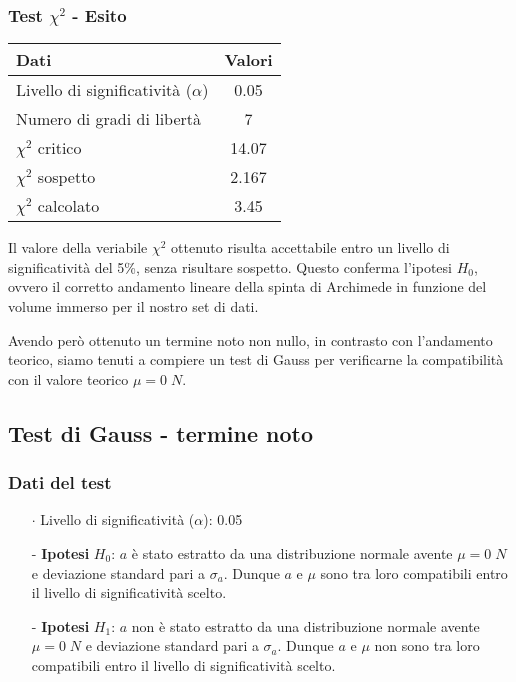 \documentclass{article}
\begin{document}
\subsubsection{Test $\chi^2$ - Esito}
\begin{wraptable}{r}{6.5cm}
	\centering
	\begin{tabular}{lc}
		\toprule
		\textbf{Dati} & \textbf{Valori} \\
		\midrule
		Livello di significatività ($\alpha $) & 0.05 \\
		Numero di gradi di libertà & 7\\
		$\chi^2$ critico & 14.07\\
        $\chi^2$ sospetto & 2.167\\
		$\chi^2$ calcolato & 3.45\\
		\bottomrule
	\end{tabular}
\end{wraptable}
Il valore della veriabile $\chi^2$  ottenuto risulta accettabile entro un livello di significatività del 5\%, senza risultare sospetto. Questo conferma l'ipotesi $H_0$, ovvero il corretto andamento lineare della spinta di Archimede in funzione del volume immerso per il nostro set di dati.\medskip

Avendo però ottenuto un termine noto non nullo, in contrasto con l'andamento teorico, siamo tenuti a compiere un test di Gauss per verificarne la compatibilità con il valore teorico $\mu=0\;N$.
\newpage\subsection{Test di Gauss - termine noto}

\subsubsection{Dati del test}
\begin{itemize}
    \item [$\cdot$] Livello di significatività ($\alpha$): 0.05
    \item [-] \textbf{Ipotesi} $H_0$: $a$ è stato estratto da una distribuzione normale avente $\mu = 0\;N$ e deviazione standard pari a $\sigma_{a}$.
    Dunque $a$ e $\mu$ sono tra loro compatibili entro il livello di significatività scelto. 
    \item [-] \textbf{Ipotesi} $H_1$: $a$ non è stato estratto da una distribuzione normale avente $\mu = 0\;N$ e deviazione standard pari a $\sigma_{a}$. Dunque $a$ e $\mu$ non sono tra loro compatibili entro il livello di significatività scelto.
\end{itemize}
\end{document}
